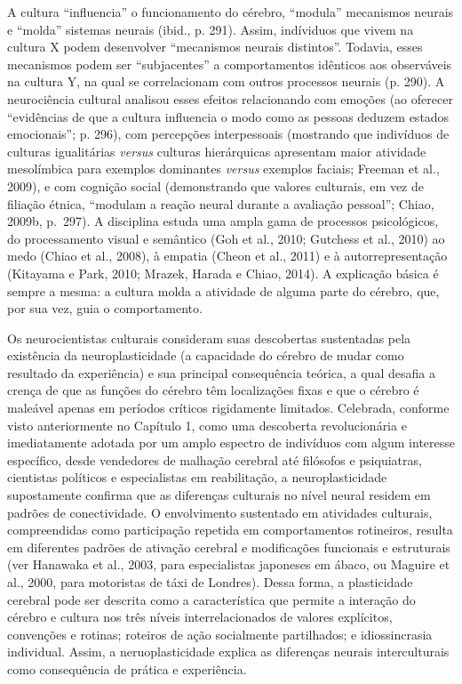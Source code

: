 A cultura ``influencia'' o funcionamento do cérebro, ``modula''
mecanismos neurais e ``molda'' sistemas neurais (ibid., p. 291). Assim,
indíviduos que vivem na cultura X podem desenvolver ``mecanismos neurais
distintos''. Todavia, esses mecanismos podem ser ``subjacentes'' a
comportamentos idênticos aos observáveis na cultura Y, na qual se
correlacionam com outros processos neurais (p. 290). A neurociência
cultural analisou esses efeitos relacionando com emoções (ao oferecer
``evidências de que a cultura influencia o modo como as pessoas deduzem
estados emocionais''; p. 296), com percepções interpessoais (mostrando
que indivíduos de culturas igualitárias \emph{versus} culturas
hierárquicas apresentam maior atividade mesolímbica para exemplos
dominantes \emph{versus} exemplos faciais; Freeman et al., 2009), e com
cognição social (demonstrando que valores culturais, em vez de filiação
étnica, ``modulam a reação neural durante a avaliação pessoal''; Chiao,
2009b, p.~297). A disciplina estuda uma ampla gama de processos
psicológicos, do processamento visual e semântico (Goh et al., 2010;
Gutchess et al., 2010) ao medo (Chiao et al., 2008), à empatia (Cheon et
al., 2011) e à autorrepresentação (Kitayama e Park, 2010; Mrazek, Harada
e Chiao, 2014). A explicação básica é sempre a mesma: a cultura molda a
atividade de alguma parte do cérebro, que, por sua vez, guia o
comportamento.

Os neurocientistas culturais consideram suas descobertas sustentadas
pela existência da neuroplasticidade (a capacidade do cérebro de mudar
como resultado da experiência) e sua principal consequência teórica, a
qual desafia a crença de que as funções do cérebro têm localizações
fixas e que o cérebro é maleável apenas em períodos críticos rigidamente
limitados. Celebrada, conforme visto anteriormente no Capítulo 1, como
uma descoberta revolucionária e imediatamente adotada por um amplo
espectro de indivíduos com algum interesse específico, desde vendedores
de malhação cerebral até filósofos e psiquiatras, cientistas políticos e
especialistas em reabilitação, a neuroplasticidade supostamente confirma
que as diferenças culturais no nível neural residem em padrões de
conectividade. O envolvimento sustentado em atividades culturais,
compreendidas como participação repetida em comportamentos rotineiros,
resulta em diferentes padrões de ativação cerebral e modificações
funcionais e estruturais (ver Hanawaka et al., 2003, para especialistas
japoneses em ábaco, ou Maguire et al., 2000, para motoristas de táxi de
Londres). Dessa forma, a plasticidade cerebral pode ser descrita como a
característica que permite a interação do cérebro e cultura nos três
níveis interrelacionados de valores explícitos, convenções e rotinas;
roteiros de ação socialmente partilhados; e idiossincrasia individual.
Assim, a neruoplasticidade explica as diferenças neurais interculturais
como consequência de prática e experiência.

